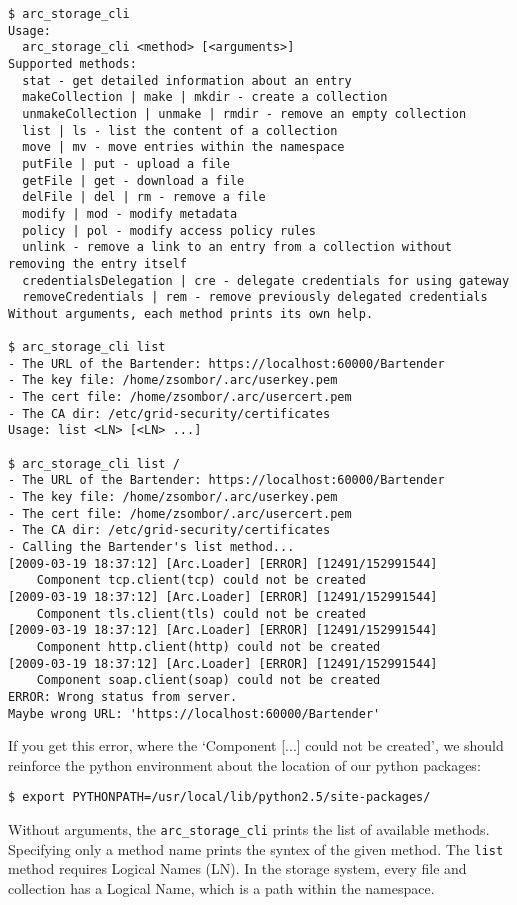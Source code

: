 \documentclass{book}
\begin{document}
\begin{verbatim}
$ arc_storage_cli
Usage:
  arc_storage_cli <method> [<arguments>]
Supported methods:
  stat - get detailed information about an entry
  makeCollection | make | mkdir - create a collection
  unmakeCollection | unmake | rmdir - remove an empty collection
  list | ls - list the content of a collection
  move | mv - move entries within the namespace
  putFile | put - upload a file
  getFile | get - download a file
  delFile | del | rm - remove a file
  modify | mod - modify metadata
  policy | pol - modify access policy rules
  unlink - remove a link to an entry from a collection without removing the entry itself
  credentialsDelegation | cre - delegate credentials for using gateway
  removeCredentials | rem - remove previously delegated credentials
Without arguments, each method prints its own help.

$ arc_storage_cli list
- The URL of the Bartender: https://localhost:60000/Bartender
- The key file: /home/zsombor/.arc/userkey.pem
- The cert file: /home/zsombor/.arc/usercert.pem
- The CA dir: /etc/grid-security/certificates
Usage: list <LN> [<LN> ...]

$ arc_storage_cli list /
- The URL of the Bartender: https://localhost:60000/Bartender
- The key file: /home/zsombor/.arc/userkey.pem
- The cert file: /home/zsombor/.arc/usercert.pem
- The CA dir: /etc/grid-security/certificates
- Calling the Bartender's list method...
[2009-03-19 18:37:12] [Arc.Loader] [ERROR] [12491/152991544]
    Component tcp.client(tcp) could not be created
[2009-03-19 18:37:12] [Arc.Loader] [ERROR] [12491/152991544]
    Component tls.client(tls) could not be created
[2009-03-19 18:37:12] [Arc.Loader] [ERROR] [12491/152991544]
    Component http.client(http) could not be created
[2009-03-19 18:37:12] [Arc.Loader] [ERROR] [12491/152991544]
    Component soap.client(soap) could not be created
ERROR: Wrong status from server.
Maybe wrong URL: 'https://localhost:60000/Bartender'
\end{verbatim}

If you get this error, where the `Component [...] could not be created', we should reinforce the python environment about the location of our python packages:

\begin{verbatim}
$ export PYTHONPATH=/usr/local/lib/python2.5/site-packages/
\end{verbatim}

Without arguments, the \verb!arc_storage_cli! prints the list of available methods. Specifying only a method name prints the syntex of the given method. The \verb!list! method requires Logical Names (LN). In the storage system, every file and collection has a Logical Name, which is a path within the namespace.
\end{document}

